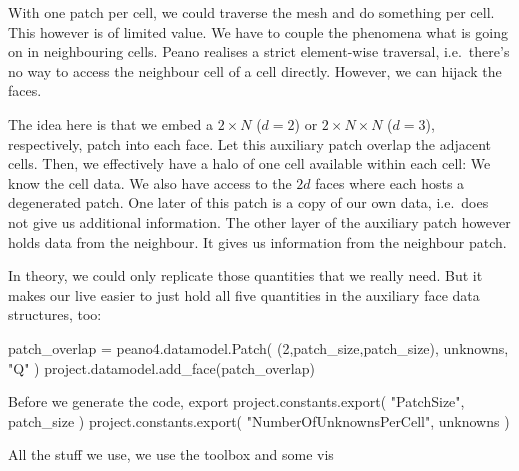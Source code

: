 With one patch per cell, we could traverse the mesh and do something per cell.
This however is of limited value.
We have to couple the phenomena what is going on in neighbouring cells.
Peano realises a strict element-wise traversal, i.e.~there's no way to access
the neighbour cell of a cell directly.
However, we can hijack the faces.


The idea here is that we embed a $2 \times N$ ($d=2$) or $2 \times N \times N$
($d=3$), respectively, patch into each face. 
Let this auxiliary patch overlap the adjacent cells.
Then, we effectively have a halo of one cell available within each cell:
We know the cell data. 
We also have access to the $2d$ faces where each hosts a degenerated patch.
One later of this patch is a copy of our own data, i.e.~does not give us
additional information.
The other layer of the auxiliary patch however holds data from the neighbour.
It gives us information from the neighbour patch.


In theory, we could only replicate those quantities that we really need. 
But it makes our live easier to just hold all five quantities in the auxiliary
face data structures, too:

\begin{code}
patch_overlap = peano4.datamodel.Patch( (2,patch_size,patch_size), unknowns, "Q" )
project.datamodel.add_face(patch_overlap)
\end{code}


Before we generate the code, export
project.constants.export( "PatchSize", patch_size )
project.constants.export( "NumberOfUnknownsPerCell", unknowns )


All the stuff we use, we use the toolbox and some vis

% 

